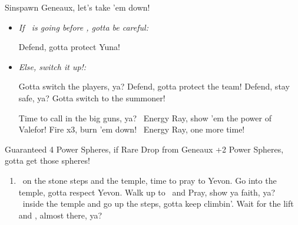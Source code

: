\begin{battle}[3000]{Sinspawn Geneaux, let's take 'em down!}
    \begin{itemize}
        \item \textit{If \tidus\ is going before \yuna, gotta be careful:}
        \begin{itemize}
            \tidusf Defend, gotta protect Yuna!
        \end{itemize}
        \item \textit{Else, switch it up!: }
        \begin{itemize}
            \switch{\yuna}{\wakka} Gotta switch the players, ya?
            \wakkaf Defend, gotta protect the team!
            \tidusf Defend, stay safe, ya?
            \switch{\lulu}{\yuna} Gotta switch to the summoner!
        \end{itemize}
        \summon{\valefor} Time to call in the big guns, ya?
        \valeforf \od\ Energy Ray, show 'em the power of Valefor!
        \valeforf Fire x3, burn 'em down!
        \valeforf \od\ Energy Ray, one more time!
    \end{itemize}
    Guaranteed 4 Power Spheres, if Rare Drop from Geneaux +2 Power Spheres, gotta get those spheres!
\end{battle}
\begin{enumerate}[resume]
    \item \sd\ on the stone steps and the temple, time to pray to Yevon. Go into the temple, gotta respect Yevon. Walk up to \wakka\ and Pray, show ya faith, ya? \sd\ inside the temple and go up the steps, gotta keep climbin'. Wait for the lift and \sd, almost there, ya?
\end{enumerate}
